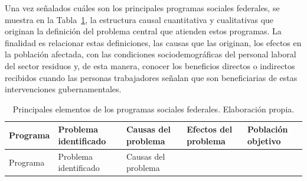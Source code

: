 \documentclass[
  spanish,
  11pt,
  a4paper,
]{scrbook}
\begin{document}
Una vez señalados cuáles son los principales programas sociales
federales, se muestra en la Tabla~\ref{tbl-2}, la estructura causal
cuantitativa y cualitativas que originan la definición del problema
central que atienden estos programas. La finalidad es relacionar estas
definiciones, las causas que las originan, los efectos en la población
afectada, con las condiciones sociodemográficas del personal laboral del
sector residuos y, de esta manera, conocer los beneficios directos o
indirectos recibidos cuando las personas trabajadores señalan que son
beneficiarias de estas intervenciones gubernamentales.

\begingroup
\scriptsize

\begin{longtable}[]{@{}
  >{\raggedright\arraybackslash}p{}
  >{\raggedright\arraybackslash}p{}
  >{\raggedright\arraybackslash}p{}
  >{\raggedright\arraybackslash}p{}
  >{\raggedright\arraybackslash}p{}@{}}
\caption{Principales elementos de los programas sociales federales.
Elaboración propia.}\label{tbl-2}\tabularnewline
\toprule\noalign{}
\begin{minipage}[b]{\linewidth}\raggedright
Programa
\end{minipage} & \begin{minipage}[b]{\linewidth}\raggedright
Problema identificado
\end{minipage} & \begin{minipage}[b]{\linewidth}\raggedright
Causas del problema
\end{minipage} & \begin{minipage}[b]{\linewidth}\raggedright
Efectos del problema
\end{minipage} & \begin{minipage}[b]{\linewidth}\raggedright
Población objetivo
\end{minipage} \\
\midrule\noalign{}
\endfirsthead
\toprule\noalign{}
\begin{minipage}[b]{\linewidth}\raggedright
Programa
\end{minipage} & \begin{minipage}[b]{\linewidth}\raggedright
Problema identificado
\end{minipage} & \begin{minipage}[b]{\linewidth}\raggedright
Causas del problema

\end{minipage}
\end{longtable}
\end{document}
